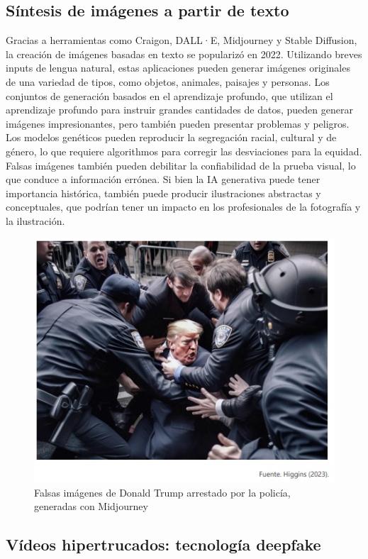 \documentclass[12pt]{article}
\begin{document}
\subsection{ Síntesis de imágenes a partir de texto}\label{sec:figs}
Gracias a herramientas como Craigon, DALL·E, Midjourney y Stable Diffusion, la creación de imágenes basadas en texto se popularizó en 2022. Utilizando breves inputs de lengua natural, estas aplicaciones pueden generar imágenes originales de una variedad de tipos, como objetos, animales, paisajes y personas. Los conjuntos de generación basados en el aprendizaje profundo, que utilizan el aprendizaje profundo para instruir grandes cantidades de datos, pueden generar imágenes impresionantes, pero también pueden presentar problemas y peligros. \\Los modelos genéticos pueden reproducir la segregación racial, cultural y de género, lo que requiere algorithmos para corregir las desviaciones para la equidad. Falsas imágenes también pueden debilitar la confiabilidad de la prueba visual, lo que conduce a información errónea. 
Si bien la IA generativa puede tener importancia histórica, también puede producir ilustraciones abstractas y conceptuales, que podrían tener un impacto en los profesionales de la fotografía y la ilustración.
\begin{figure}
    \centering
    \includegraphics[width=0.5\linewidth]{WhatsApp Image 2024-09-18 at 20.52.39.jpeg}
    \caption{Falsas imágenes de Donald Trump arrestado por la policía, generadas con Midjourney}
    \label{fig:enter-label}
\end{figure}


\subsection{Vídeos hipertrucados: tecnología deepfake}
\end{document}
